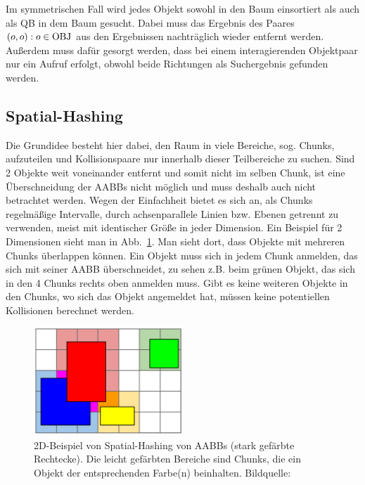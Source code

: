 Im symmetrischen Fall wird jedes Objekt sowohl in den Baum einsortiert als auch als QB in dem Baum gesucht. Dabei muss das Ergebnis des Paares $(o, o) : o \in \operatorname{OBJ}$ aus den Ergebnissen nachträglich wieder entfernt werden. Außerdem muss dafür gesorgt werden, dass bei einem interagierenden Objektpaar nur ein Aufruf erfolgt, obwohl beide Richtungen als Suchergebnis gefunden werden.\\

\subsection{Spatial-Hashing}
\label{sec:spatialHashing}
Die Grundidee besteht hier dabei, den Raum in viele Bereiche, sog. Chunks, aufzuteilen und Kollisionspaare nur innerhalb dieser Teilbereiche zu suchen. Sind 2 Objekte weit voneinander entfernt und somit nicht im selben Chunk, ist eine Überschneidung der AABBs nicht möglich und muss deshalb auch nicht betrachtet werden. Wegen der Einfachheit bietet es sich an, als Chunks regelmäßige Intervalle, durch achsenparallele Linien bzw. Ebenen getrennt zu verwenden, meist mit identischer Größe in jeder Dimension. Ein Beispiel für 2 Dimensionen sieht man in Abb.~\ref{fig:spatialHashing}.
Man sieht dort, dass Objekte mit mehreren Chunks überlappen können. Ein Objekt muss sich in jedem Chunk anmelden, das sich mit seiner AABB überschneidet, zu sehen z.B. beim grünen Objekt, das sich in den 4 Chunks rechts oben anmelden muss. Gibt es keine weiteren Objekte in den Chunks, wo sich das Objekt angemeldet hat, müssen keine potentiellen Kollisionen berechnet werden.\\
\begin{figure}
    \centering
    \includegraphics[width=0.5\textwidth]{./res/spatialHashingAABB.png}
    \caption{2D-Beispiel von Spatial-Hashing von AABBs (stark gefärbte Rechtecke). Die leicht gefärbten Bereiche sind Chunks, die ein Objekt der entsprechenden Farbe(n) beinhalten. Bildquelle: \cite{spatialHashing}}
    \label{fig:spatialHashing}
\end{figure}
